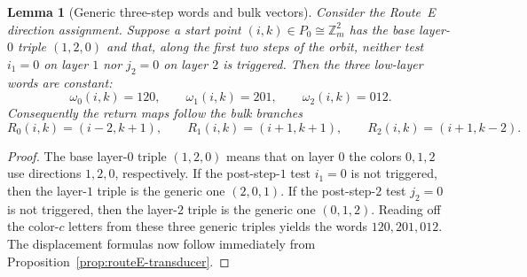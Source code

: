 \documentclass[11pt]{article}
\newtheorem{lemma}{Lemma}
\newcommand{\Zm}{\mathbb Z_m}
\begin{document}
\begin{lemma}[Generic three-step words and bulk vectors]\label{lem:routeE-generic}
Consider the Route~E direction assignment.
Suppose a start point $(i,k)\in P_0\cong\Zm^2$ has the base layer-$0$ triple $(1,2,0)$ and that, along the first two steps of the orbit, neither test $i_1=0$ on layer $1$ nor $j_2=0$ on layer $2$ is triggered.
Then the three low-layer words are constant:
\[
\omega_0(i,k)=120,\qquad \omega_1(i,k)=201,\qquad \omega_2(i,k)=012.
\]
Consequently the return maps follow the bulk branches
\[
R_0(i,k)=(i-2,k+1),\qquad R_1(i,k)=(i+1,k+1),\qquad R_2(i,k)=(i+1,k-2).
\]
\end{lemma}

\begin{proof}
The base layer-$0$ triple $(1,2,0)$ means that on layer $0$ the colors $0,1,2$ use directions $1,2,0$, respectively.
If the post-step-$1$ test $i_1=0$ is not triggered, then the layer-$1$ triple is the generic one $(2,0,1)$.
If the post-step-$2$ test $j_2=0$ is not triggered, then the layer-$2$ triple is the generic one $(0,1,2)$.
Reading off the color-$c$ letters from these three generic triples yields the words $120,201,012$.
The displacement formulas now follow immediately from Proposition~\ref{prop:routeE-transducer}.
\end{proof}
\end{document}
